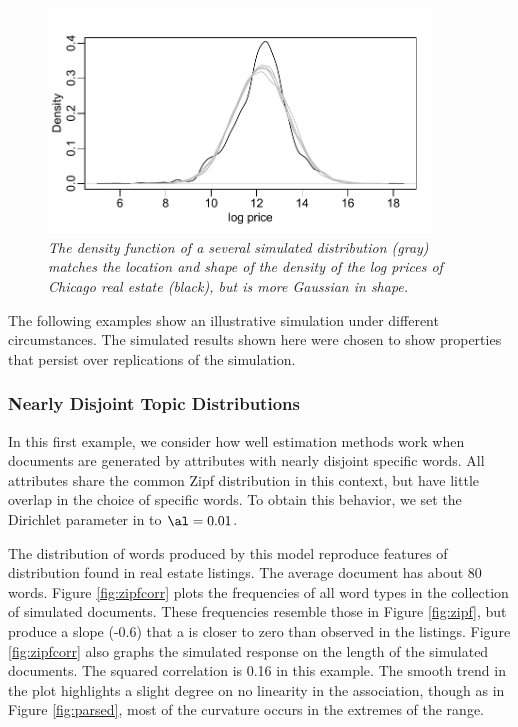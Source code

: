 \documentclass[12pt]{article}
\begin{document}
\begin{figure}
\caption{  \label{fig:density}  
  {\sl The density function of a several simulated distribution (gray) matches the location and shape of the density of the log prices of Chicago real estate (black), but is more Gaussian in shape.}  }
  \centerline{ \includegraphics[width=4in]{figures/density.pdf} }
\end{figure}
 
 
 The following examples show an illustrative simulation under different circumstances.  The simulated results shown here were chosen to show properties that persist over replications of the simulation. 
 
 
 \subsubsection{Nearly Disjoint Topic Distributions} %
  
In this first example, we consider how well estimation methods work when documents are generated by attributes with nearly disjoint specific words.  All attributes share the common Zipf distribution in this context, but have little overlap in the choice of specific words.  To obtain this behavior, we set the Dirichlet parameter in  to $\al = 0.01$.   

The distribution of words produced by this model  reproduce features of distribution found in real estate listings.  The average document has about 80 words.  Figure \ref{fig:zipfcorr} plots the frequencies of all word types in the collection of simulated documents.  These frequencies resemble those in Figure \ref{fig:zipf}, but produce a slope (-0.6) that a is closer to zero than observed in the listings.  Figure \ref{fig:zipfcorr} also graphs the simulated response on the length of the simulated documents.  The squared correlation is 0.16 in this example.  The smooth trend in the plot highlights a slight degree on no linearity in the association, though as in Figure \ref{fig:parsed}, most of the curvature occurs in the extremes of the range.
\end{document}
